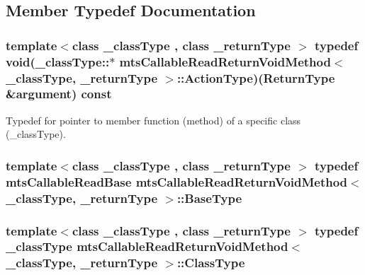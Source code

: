 \subsection{Member Typedef Documentation}
\hypertarget{classmts_callable_read_return_void_method_a7f3934dc425501d4af892248c4930525}{
\subsubsection[{Action\-Type}]{\setlength{\rightskip}{0pt plus 5cm}template$<$class \-\_\-class\-Type , class \-\_\-return\-Type $>$ typedef void(\-\_\-class\-Type\-::$\ast$ {\bf mts\-Callable\-Read\-Return\-Void\-Method}$<$ \-\_\-class\-Type, \-\_\-return\-Type $>$\-::Action\-Type)({\bf Return\-Type} \&argument) const }}\label{classmts_callable_read_return_void_method_a7f3934dc425501d4af892248c4930525}
Typedef for pointer to member function (method) of a specific class (\-\_\-class\-Type). \hypertarget{classmts_callable_read_return_void_method_a9dbeaf2b51dba8323c5672945801307c}{
\subsubsection[{Base\-Type}]{\setlength{\rightskip}{0pt plus 5cm}template$<$class \-\_\-class\-Type , class \-\_\-return\-Type $>$ typedef {\bf mts\-Callable\-Read\-Base} {\bf mts\-Callable\-Read\-Return\-Void\-Method}$<$ \-\_\-class\-Type, \-\_\-return\-Type $>$\-::{\bf Base\-Type}}}\label{classmts_callable_read_return_void_method_a9dbeaf2b51dba8323c5672945801307c}
\hypertarget{classmts_callable_read_return_void_method_a694e26a4c7fc28f0c739aa2f2ab97e12}{
\subsubsection[{Class\-Type}]{\setlength{\rightskip}{0pt plus 5cm}template$<$class \-\_\-class\-Type , class \-\_\-return\-Type $>$ typedef \-\_\-class\-Type {\bf mts\-Callable\-Read\-Return\-Void\-Method}$<$ \-\_\-class\-Type, \-\_\-return\-Type $>$\-::{\bf Class\-Type}}}\label{classmts_callable_read_return_void_method_a694e26a4c7fc28f0c739aa2f2ab97e12}
